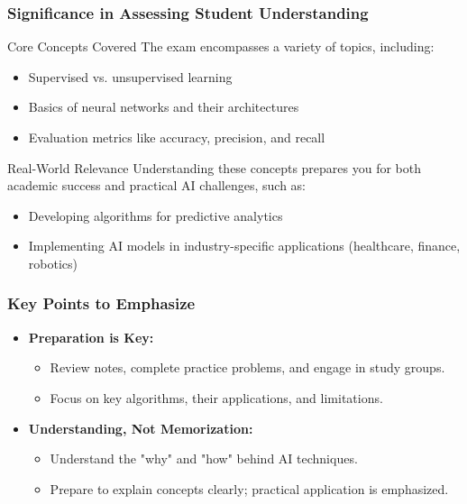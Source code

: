 \documentclass[aspectratio=169]{beamer}
\begin{document}
\begin{frame}[fragile]
    \frametitle{Significance in Assessing Student Understanding}
    \begin{block}{Core Concepts Covered}
        The exam encompasses a variety of topics, including:
        \begin{itemize}
            \item Supervised vs. unsupervised learning
            \item Basics of neural networks and their architectures
            \item Evaluation metrics like accuracy, precision, and recall
        \end{itemize}
    \end{block}

    \begin{block}{Real-World Relevance}
        Understanding these concepts prepares you for both academic success and practical AI challenges, such as:
        \begin{itemize}
            \item Developing algorithms for predictive analytics
            \item Implementing AI models in industry-specific applications (healthcare, finance, robotics)
        \end{itemize}
    \end{block}
\end{frame}

\begin{frame}[fragile]
    \frametitle{Key Points to Emphasize}
    \begin{itemize}
        \item \textbf{Preparation is Key:}
        \begin{itemize}
            \item Review notes, complete practice problems, and engage in study groups.
            \item Focus on key algorithms, their applications, and limitations.
        \end{itemize}
        \item \textbf{Understanding, Not Memorization:}
        \begin{itemize}
            \item Understand the "why" and "how" behind AI techniques.
            \item Prepare to explain concepts clearly; practical application is emphasized.
        \end{itemize}
    \end{itemize}
\end{frame}
\end{document}
